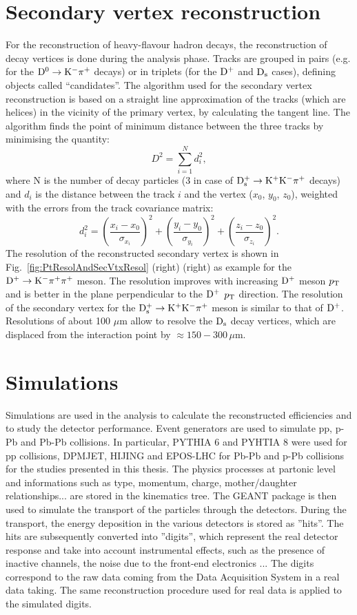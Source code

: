 \section{Secondary vertex reconstruction}
\label{sec:secVertex}
For the reconstruction of heavy-flavour hadron decays, the reconstruction of decay vertices 
is done during the analysis phase. Tracks are grouped in pairs (e.g. for the ${\rm D^0\to K^-\pi^+}$ decays) or in triplets (for the ${\rm D^+}$ and ${\rm D_s}$ cases), 
defining objects called ``candidates''. 
The algorithm used for the secondary vertex reconstruction is based on a straight 
line approximation of the tracks (which are helices) in the vicinity of the primary vertex, by calculating the tangent line.
The algorithm finds the point of minimum distance between the three tracks by minimising the quantity:
\begin{equation}
D^2= \sum_{i=1}^N d_i^2,
\end{equation}
where N is the number of decay particles (3 in case of ${\rm D^{+}_\mathrm{s}\to K^+ K^-\pi^+}$ decays) and $d_i$ is the distance between the track $i$ and the vertex 
($x_0$, $y_0$, $z_0$), weighted with the errors from the track covariance matrix:
\begin{equation}
d^2_i=\left(\frac{x_i-x_0}{\sigma_{x_i}}\right)^2+
\left(\frac{y_i-y_0}{\sigma_{y_i}}\right)^2+\left(\frac{z_i-z_0}{\sigma_{z_i}}\right)^2.
\end{equation}
The resolution of the reconstructed secondary vertex is shown in Fig.~\ref{fig:PtResolAndSecVtxResol} (right) 
(right) as example for the ${\rm D}^+\to {\rm K}^-\pi^+\pi^+$ meson. The 
resolution improves with increasing ${\rm D^+}$ meson $p_{\rm T}$ and is better in the plane perpendicular to the ${\rm D^+}$ $p_{\rm T}$ direction.
The resolution of the secondary vertex for the ${\rm D^{+}_\mathrm{s}\to K^+ K^-\pi^+}$ meson is similar to that of ${\rm D^+}$.
Resolutions of about 100 $\mu$m allow to resolve the ${\rm D_s}$ decay vertices, which are
displaced from the interaction point by $\approx 150-300\,\mu$m.


\section{Simulations}
\label{sec:simu}
Simulations are used in the analysis to calculate the reconstructed efficiencies and to study the detector
performance.
Event generators are used to simulate pp, p-Pb and Pb-Pb collisions. In particular, PYTHIA 6 and
PYHTIA 8 were used for pp collisions, DPMJET, HIJING and EPOS-LHC for Pb-Pb and p-Pb collisions
for the studies presented in this thesis.
The physics processes at partonic level and informations such as type, momentum, 
charge, mother/daughter relationships... are stored in the kinematics tree. The GEANT package
is then used to simulate the transport of the particles through the
  detectors. During the transport, the energy deposition in the various detectors is stored 
  as ''hits''. The hits are subsequently converted into ''digits'', which represent 
  the real detector response and take into account instrumental effects, such as the presence of inactive channels, the noise 
  due to the front-end electronics ... The digits correspond to the raw data coming from the 
  Data Acquisition System in a real data taking. The same reconstruction procedure used for real data is applied to the simulated
  digits.

